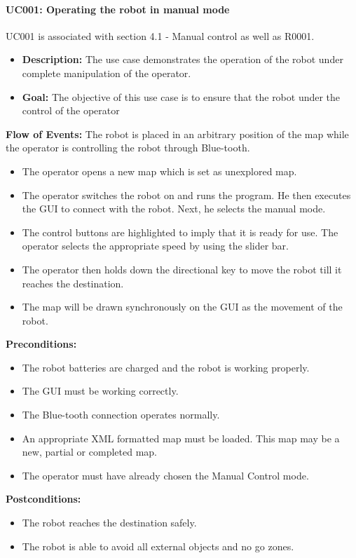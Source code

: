 \documentclass[11pt, a4paper]{report}
\begin{document}
\paragraph{UC001: Operating the robot in manual mode}
UC001 is associated with section 4.1 - Manual control as well as R0001.
	\begin{itemize}	
		\item \textbf{Description:} The use case demonstrates the operation of the robot under complete manipulation of the operator.
		\item \textbf{Goal:} The objective of this use case is to ensure that the robot under the control of the operator
	\end{itemize}
	\textbf{Flow of Events:} The robot is placed in an arbitrary position of the map while
	the operator is controlling the robot through Blue-tooth.
	\begin{itemize}
		\item The operator opens a new map which is set as unexplored map.  
		\item The operator switches the robot on and runs the program. He then executes the GUI to connect with the robot. Next, he selects the manual mode.
		\item The control buttons are highlighted to imply that it is ready for use. The operator selects the appropriate speed by using the slider bar.
		\item The operator then holds down the directional key to move the robot till it reaches the destination.	
		\item The map will be drawn synchronously on the GUI as the movement of the robot.   	
	\end{itemize}
	\textbf{Preconditions:}
	\begin{itemize}
		\item	The robot batteries are charged and the robot is working properly.
		\item	The GUI must be working correctly.
		\item	The Blue-tooth connection operates normally.
		\item	An appropriate XML formatted map must be loaded. This map may be a new, partial or completed map.
		\item The operator must have already chosen the Manual Control mode. 
	\end{itemize}
	\textbf{Postconditions:}
	\begin{itemize}
		\item The robot reaches the destination safely.
		\item The robot is able to avoid all external objects and no go zones.
	\end{itemize}
\end{document}
